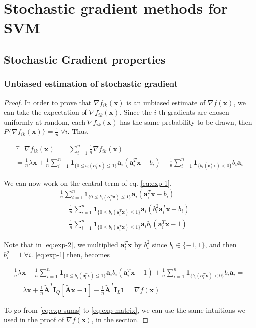 \documentclass[12pt]{article}
\newcommand{\xb}{\mathbf{x}}
\newcommand{\ab}{\mathbf{a}}
\newcommand{\abi}{\ab_i}
\newcommand{\sumin}{\sum_{i = 1}^n}
\newcommand{\ax}{\abi^T\xb}
\newcommand{\atilde}{\mathbf{\tilde{A}}}
\newcommand{\id}{\mathbf{I}}
\newcommand{\ones}{\mathbf{1}}
\newcommand{\gradik}{\nabla f_{ik}}
\newcommand{\fracn}{\frac{1}{n}}
\newcommand{\linearpred}{b_i(\ax) < 0}
\newcommand{\quadrpred}{0 \leq b_i(\ax) \leq 1}
\newcommand{\linearone}{\ones_{\{\linearpred\}}}
\newcommand{\quadrone}{\ones_{\{\quadrpred\}}}
\begin{document}
\section{Stochastic gradient methods for SVM}

\subsection*{Stochastic Gradient properties}
\subsubsection*{Unbiased estimation of stochastic gradient}

\begin{proof}

In order to prove that $\gradik(\xb)$ is an unbiased estimate of $\nabla f(\xb)$, we can take the expectation of $\gradik(\xb)$. Since the $i$-th gradients are chosen uniformly at random, each $\gradik(\xb)$ has the same probability to be drawn, then $P\{\gradik(\xb)\} = \fracn \ \forall i$. Thus,

\begin{gather}
    \mathbb{E}[\gradik(\xb)] = \sumin \fracn \gradik(\xb) = \nonumber \\
    = \fracn\lambda\xb + \fracn \sumin \quadrone \ab_i(\abi^T\xb - b_i) + \fracn \sumin \linearone b_i \abi \label{eq:exp-1}
\end{gather}

We can now work on the central term of eq. \eqref{eq:exp-1}, 
\begin{gather}
    \fracn \sumin \quadrone \ab_i(\abi^T\xb - b_i) = \nonumber \\
    = \fracn \sumin \quadrone \ab_i(b_i^2\abi^T\xb - b_i) = \label{eq:exp-2} \\
    = \fracn \sumin \quadrone \ab_i b_i(\abi^T\xb - 1)
\end{gather}

Note that in \eqref{eq:exp-2}, we multiplied $\abi^T\xb$ by $b_i^2$ since $b_i \in \{-1, 1\}$, and then $b_i^2 = 1 \ \forall i$. \eqref{eq:exp-1} then, becomes

\begin{gather}
    \fracn\lambda\xb + \fracn \sumin \quadrone \ab_i b_i(\abi^T\xb - 1) + \fracn \sumin \linearone b_i \abi = \label{eq:exp-sums} \\
    = \lambda\xb + \fracn\atilde^T\id_Q[\atilde \xb - \ones] - \fracn\atilde^T\id_L\ones = \nabla f(\xb) \label{eq:exp-matrix}
\end{gather}

To go from \eqref{eq:exp-sums} to \eqref{eq:exp-matrix}, we can use the same intuitions we used in the proof of $\nabla f(\xb)$, in the  section.

\end{proof}
\end{document}
